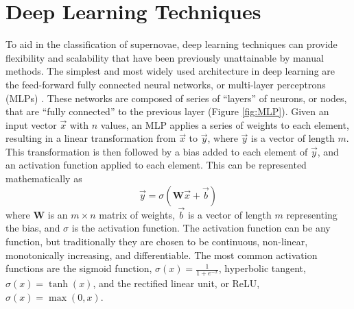 \chapter{Deep Learning Techniques}
\label{chap:MLTechniques}

To aid in the classification of supernovae, deep learning techniques can provide 
flexibility and scalability that have been previously unattainable by manual 
methods. The simplest and most widely used architecture in deep learning are the feed-forward 
fully connected neural networks, or multi-layer perceptrons (MLPs) \parencite{popescu2009}.
These networks are composed of series of ``layers'' of neurons, or nodes, that 
are ``fully connected'' to the previous layer (Figure \ref{fig:MLP}).
Given an input vector $\vec{x}$ with $n$ values, an MLP applies a series of weights to each 
element, resulting in a linear transformation from $\vec{x}$ to $\vec{y}$, where
$\vec{y}$ is a vector of length $m$. This transformation is then followed by a bias added 
to each element of $\vec{y}$, and an activation function applied to each element.
This can be represented mathematically as 
\begin{equation}\label{eqn:MLP}
    \vec{y} = \sigma(\mathbf{W}\vec{x} + \vec{b})
\end{equation}
where $\mathbf{W}$ is an $m \times n$ matrix of weights, $\vec{b}$ is a vector of length $m$
representing the bias, and $\sigma$ is the activation function. The activation function can 
be any function, but traditionally they are chosen to be continuous, non-linear, 
monotonically increasing, and differentiable. The most common activation functions 
are the sigmoid function, $\sigma(x) = \frac{1}{1 + e^{-x}}$, hyperbolic tangent, 
$\sigma(x) = \tanh(x)$, and the rectified linear unit, or ReLU,
$\sigma(x) = \max(0, x)$.


